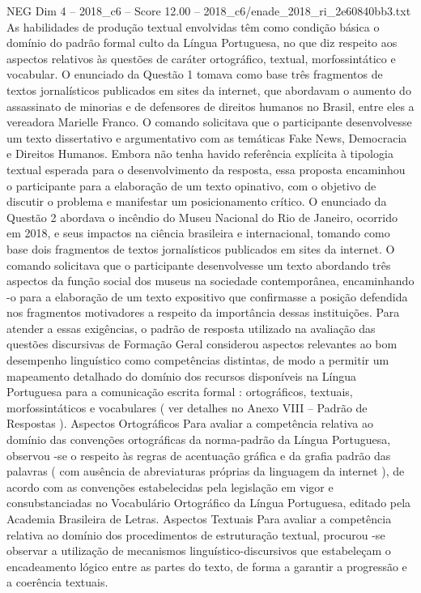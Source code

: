 \begin{textsample}{NEG Dim 4 – 2018\_c6 – Score 12.00 – 2018\_c6/enade\_2018\_ri\_2e60840bb3.txt}
As habilidades de produção textual envolvidas têm como condição básica o domínio do padrão formal culto da Língua Portuguesa, no que diz respeito aos aspectos relativos às questões de caráter ortográfico, textual, morfossintático e vocabular.
O enunciado da Questão 1 tomava como base três fragmentos de textos jornalísticos publicados em sites da internet, que abordavam o aumento do assassinato de minorias e de defensores de direitos humanos no Brasil, entre eles a vereadora Marielle Franco.
O comando solicitava que o participante desenvolvesse um texto dissertativo e argumentativo com as temáticas Fake News, Democracia e Direitos Humanos.
Embora não tenha havido referência explícita à tipologia textual esperada para o desenvolvimento da resposta, essa proposta encaminhou o participante para a elaboração de um texto opinativo, com o objetivo de discutir o problema e manifestar um posicionamento crítico.
O enunciado da Questão 2 abordava o incêndio do Museu Nacional do Rio de Janeiro, ocorrido em 2018, e seus impactos na ciência brasileira e internacional, tomando como base dois fragmentos de textos jornalísticos publicados em sites da internet.
O comando solicitava que o participante desenvolvesse um texto abordando três aspectos da função social dos museus na sociedade contemporânea, encaminhando -o para a elaboração de um texto expositivo que confirmasse a posição defendida nos fragmentos motivadores a respeito da importância dessas instituições.
Para atender a essas exigências, o padrão de resposta utilizado na avaliação das questões discursivas de Formação Geral considerou aspectos relevantes ao bom desempenho linguístico como competências distintas, de modo a permitir um mapeamento detalhado do domínio dos recursos disponíveis na Língua Portuguesa para a comunicação escrita formal : ortográficos, textuais, morfossintáticos e vocabulares ( ver detalhes no Anexo VIII – Padrão de Respostas ).
Aspectos Ortográficos Para avaliar a competência relativa ao domínio das convenções ortográficas da norma-padrão da Língua Portuguesa, observou -se o respeito às regras de acentuação gráfica e da grafia padrão das palavras ( com ausência de abreviaturas próprias da linguagem da internet ), de acordo com as convenções estabelecidas pela legislação em vigor e consubstanciadas no Vocabulário Ortográfico da Língua Portuguesa, editado pela Academia Brasileira de Letras.
Aspectos Textuais Para avaliar a competência relativa ao domínio dos procedimentos de estruturação textual, procurou -se observar a utilização de mecanismos linguístico-discursivos que estabeleçam o encadeamento lógico entre as partes do texto, de forma a garantir a progressão e a coerência textuais.

\end{textsample}
